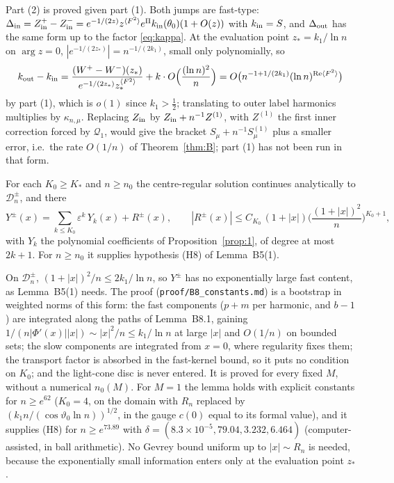 \documentclass{amsart}
\numberwithin{equation}{section}
\theoremstyle{plain}
\newenvironment{lemnamed}[1]{\renewcommand\theinnerlem{#1}\innerlem}{\endinnerlem}
\theoremstyle{definition}
\theoremstyle{remark}
\newcommand{\eps}{\varepsilon}
\newcommand{\re}{\operatorname{Re}}
\newcommand{\repo}[1]{\texttt{#1}}
\begin{document}
Part (2) is proved given part (1). Both jumps are fast-type: $\Delta_{\rm in} = Z^+_{\rm in} - Z^-_{\rm in} =
e^{-1/(2z)}z^{\langle F^2\rangle}e^{\Pi}k_{\rm in}(\theta_0)(1 + O(z))$ with $k_{\rm in} = S$, and $\Delta_{\rm out}$ has the same form up to
the factor \eqref{eq:kappa}. At the evaluation point $z_* = k_1/\ln n$ on $\arg z = 0$, $|e^{-1/(2z_*)}| = n^{-1/(2k_1)}$, small
only polynomially, so
\[
k_{\rm out} - k_{\rm in} = \frac{(W^+ - W^-)(z_*)}{e^{-1/(2z_*)}z_*^{\langle F^2\rangle}} + k\cdot O\Big(\frac{(\ln n)^2}{n}\Big)
= O\big(n^{-1+1/(2k_1)}(\ln n)^{\re\langle F^2\rangle}\big)
\]
by part (1), which is $o(1)$ since $k_1 > \tfrac12$; translating to outer label harmonics multiplies by $\kappa_{n,\mu}$.
Replacing $Z_{\rm in}$ by $Z_{\rm in} + n^{-1}Z^{(1)}$, with $Z^{(1)}$ the first inner correction forced by $\mathcal Q_1$, would give
the bracket $S_\mu + n^{-1}S^{(1)}_\mu$ plus a smaller error, i.e.\ the rate $O(1/n)$ of Theorem~\ref{thm:B}; part (1) has not been
run in that form.

\begin{lemnamed}{B8($M$) (global continuation)}\label{lem:B8}
For each $K_0 \ge K_*$ and $n \ge n_0$ the centre-regular solution continues analytically to $\mathcal D^\pm_n$, and there
\[
Y^\pm(x) = \sum_{k \le K_0}\eps^k\,Y_k(x) + R^\pm(x), \qquad |R^\pm(x)| \le C_{K_0}\,(1 + |x|)\Big(\frac{(1+|x|)^2}{n}\Big)^{K_0+1},
\]
with $Y_k$ the polynomial coefficients of Proposition~\ref{prop:1}, of degree at most $2k+1$. For $n \ge n_0$ it supplies
hypothesis (H8) of Lemma~B5(1).
\end{lemnamed}

On $\mathcal D^\pm_n$, $(1+|x|)^2/n \le 2k_1/\ln n$, so $Y^\pm$ has no exponentially large fast content, as Lemma~B5(1) needs. The
proof (\repo{proof/B8\_constants.md}) is a bootstrap in weighted norms of this form: the fast components ($p + m$ per harmonic,
and $b - 1$) are integrated along the paths of Lemma~B8.1, gaining $1/(n|\Phi'(x)||x|) \sim |x|^2/n \le k_1/\ln n$ at large
$|x|$ and $O(1/n)$ on bounded sets; the slow components are integrated from $x = 0$, where regularity fixes them; the
transport factor is absorbed in the fast-kernel bound, so it puts no condition on $K_0$; and the light-cone disc is never
entered. It is proved for every fixed $M$, without a numerical $n_0(M)$. For $M = 1$ the lemma holds with explicit constants
for $n \ge e^{62}$ ($K_0 = 4$, on the domain with $R_n$ replaced by $(k_1n/(\cos\vartheta_0\ln n))^{1/2}$, in the gauge $c(0)$
equal to its formal value), and it supplies (H8) for $n \ge e^{73.89}$ with $\delta = (8.3\times10^{-5}, 79.04, 3.232, 6.464)$
(computer-assisted, in ball arithmetic). No Gevrey bound uniform up to $|x| \sim R_n$ is needed, because the exponentially
small information enters only at the evaluation point $z_*$.
\end{document}
